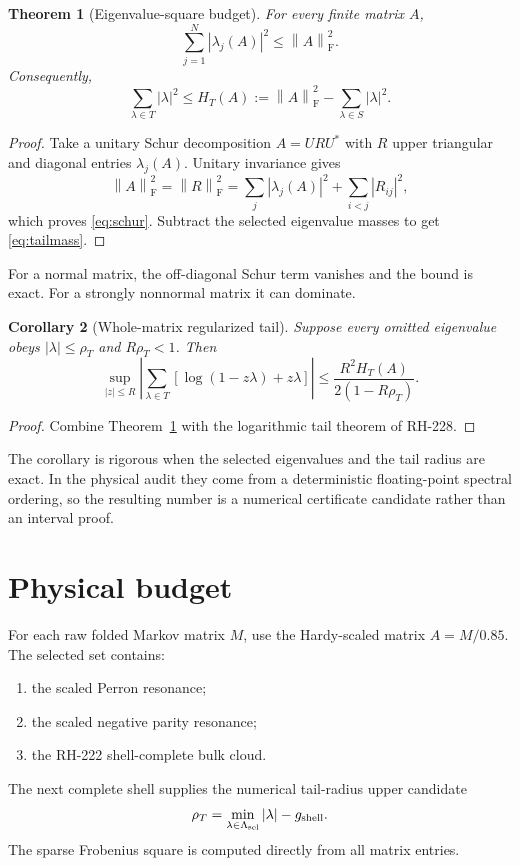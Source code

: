 \documentclass[11pt]{article}
\newtheorem{theorem}{Theorem}[section]
\newtheorem{corollary}[theorem]{Corollary}
\theoremstyle{remark}\newtheorem{remark}[theorem]{Remark}
\newcommand{\norm}[1]{\left\lVert#1\right\rVert}
\begin{document}
\begin{theorem}[Eigenvalue-square budget]\label{thm:schur}
For every finite matrix $A$,
\begin{equation}\label{eq:schur}
 \sum_{j=1}^N|\lambda_j(A)|^2\le\norm A_{\mathrm F}^2.
\end{equation}
Consequently,
\begin{equation}\label{eq:tailmass}
 \sum_{\lambda\in T}|\lambda|^2
 \le H_T(A):=
 \norm A_{\mathrm F}^2-\sum_{\lambda\in S}|\lambda|^2.
\end{equation}
\end{theorem}
\begin{proof}
Take a unitary Schur decomposition $A=URU^*$ with $R$ upper triangular and
diagonal entries $\lambda_j(A)$. Unitary invariance gives
\[
 \norm A_{\mathrm F}^2=\norm R_{\mathrm F}^2
 =\sum_j|\lambda_j(A)|^2+\sum_{i<j}|R_{ij}|^2,
\]
which proves \eqref{eq:schur}. Subtract the selected eigenvalue masses to get
\eqref{eq:tailmass}.
\end{proof}

For a normal matrix, the off-diagonal Schur term vanishes and the bound is
exact. For a strongly nonnormal matrix it can dominate.

\begin{corollary}[Whole-matrix regularized tail]\label{cor:det}
Suppose every omitted eigenvalue obeys $|\lambda|\le\rho_T$ and
$R\rho_T<1$. Then
\begin{equation}\label{eq:detbound}
 \sup_{|z|\le R}
 \left|\sum_{\lambda\in T}
 [\log(1-z\lambda)+z\lambda]\right|
 \le
 \frac{R^2H_T(A)}{2(1-R\rho_T)}.
\end{equation}
\end{corollary}
\begin{proof}
Combine Theorem~\ref{thm:schur} with the logarithmic tail theorem of RH-228.
\end{proof}

The corollary is rigorous when the selected eigenvalues and the tail radius
are exact. In the physical audit they come from a deterministic
floating-point spectral ordering, so the resulting number is a numerical
certificate candidate rather than an interval proof.

\section{Physical budget}

For each raw folded Markov matrix $M$, use the Hardy-scaled matrix
$A=M/0.85$. The selected set contains:
\begin{enumerate}[leftmargin=2em]
\item the scaled Perron resonance;
\item the scaled negative parity resonance;
\item the RH-222 shell-complete bulk cloud.
\end{enumerate}
The next complete shell supplies the numerical tail-radius upper candidate
\begin{equation}
 \rho_T=
 \min_{\lambda\in\Lambda_{\rm sel}}|\lambda|
 -g_{\rm shell}.
\end{equation}
The sparse Frobenius square is computed directly from all matrix entries.
\end{document}
